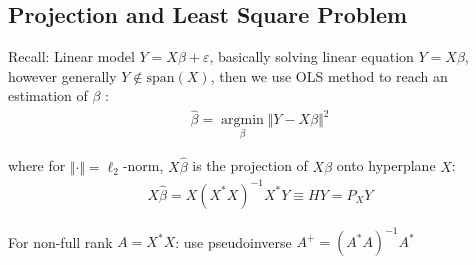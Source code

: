         
    
        

    






\subsection{Projection and Least Square Problem}
    Recall: Linear model $ Y=X\beta +\varepsilon  $, basically solving linear equation $ Y=X\beta  $, however generally $ Y\notin \mathrm{span}(X)  $, then we use OLS method to reach an estimation of $ \beta$    :
    \begin{align}
        \hat{\beta }=\mathop{\arg\min}\limits_{\beta }\Vert Y-X\beta  \Vert^2
    \end{align}
    
    where for $ \Vert \cdot \Vert = \ell_2 $-norm, $ X\hat{\beta } $ is the projection of $ X\beta  $ onto hyperplane $ X $:
    \begin{align}
        X\hat{\beta }= X(X^*X)^{-1}X^*Y\equiv HY=P_XY
    \end{align}

    For non-full rank $ A=X^*X $: use pseudoinverse $ A^+=(A^*A)^{-1}A^* $
    
    
    
